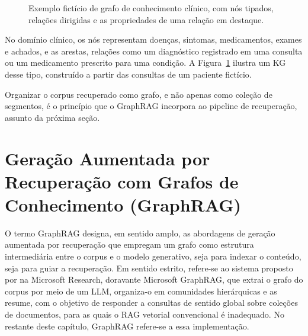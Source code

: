 \begin{figure}[!htbp]
\caption[Grafo de conhecimento clínico no estilo do Neo4j]{Exemplo fictício de grafo de conhecimento clínico, com nós tipados, relações dirigidas e as propriedades de uma relação em destaque.}
\label{fig:kg-exemplo}
\par{}
\end{figure}

No domínio clínico, os nós representam doenças, sintomas, medicamentos, exames e achados, e as arestas, relações como um diagnóstico registrado em uma consulta ou um medicamento prescrito para uma condição. A Figura~\ref{fig:kg-exemplo} ilustra um KG desse tipo, construído a partir das consultas de um paciente fictício.

Organizar o corpus recuperado como grafo, e não apenas como coleção de segmentos, é o princípio que o GraphRAG incorpora ao pipeline de recuperação, assunto da próxima seção.

\FloatBarrier
\section[Geração Aumentada por Recuperação com Grafos de Conhecimento]{Geração Aumentada por Recuperação com Grafos de Conhecimento (GraphRAG)}\label{sec:graphrag}

O termo GraphRAG designa, em sentido amplo, as abordagens de geração aumentada por recuperação que empregam um grafo como estrutura intermediária entre o corpus e o modelo generativo, seja para indexar o conteúdo, seja para guiar a recuperação. Em sentido estrito, refere-se ao sistema proposto por \citet{edge2024} na Microsoft Research, doravante Microsoft GraphRAG, que extrai o grafo do corpus por meio de um LLM, organiza-o em comunidades hierárquicas e as resume, com o objetivo de responder a consultas de sentido global sobre coleções de documentos, para as quais o RAG vetorial convencional é inadequado. No restante deste capítulo, GraphRAG refere-se a essa implementação.


